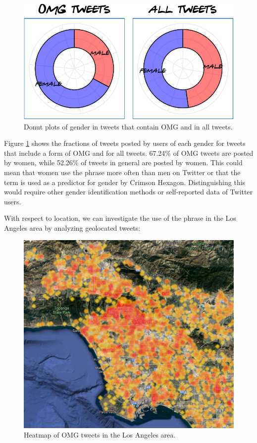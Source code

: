 \documentclass[]{article}
\begin{document}
\begin{figure}

{\centering \includegraphics{Friends_HPS_pdf_files/figure-latex/twittergender-1} 

}

\caption{Donut plots of gender in tweets that contain OMG and in all tweets.}\label{fig:twittergender}
\end{figure}

Figure \ref{fig:twittergender} shows the fractions of tweets posted by users of each gender for tweets that include a form of OMG and for all tweets. 67.24\% of OMG tweets are posted by women, while 52.26\% of tweets in general are posted by women. This could mean that women use the phrase more often than men on Twitter or that the term is used as a predictor for gender by Crimson Hexagon. Distinguishing this would require other gender identification methods or self-reported data of Twitter users.

With respect to location, we can investigate the use of the phrase in the Los Angeles area by analyzing geolocated tweets:

\begin{figure}

{\centering \includegraphics[width=0.75\linewidth]{LAtweets} 

}

\caption{Heatmap of OMG tweets in the Los Angeles area.}\label{fig:twitterLA}
\end{figure}
\end{document}

